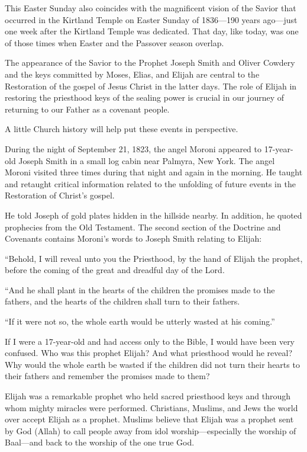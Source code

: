 \documentclass[letterpaper, 11pt]{report}
\begin{document}
This Easter Sunday also coincides with the magnificent vision of the Savior that occurred in the Kirtland Temple on Easter Sunday of 1836—190 years ago—just one week after the Kirtland Temple was dedicated. That day, like today, was one of those times when Easter and the Passover season overlap.

The appearance of the Savior to the Prophet Joseph Smith and Oliver Cowdery and the keys committed by Moses, Elias, and Elijah are central to the Restoration of the gospel of Jesus Christ in the latter days. The role of Elijah in restoring the priesthood keys of the sealing power is crucial in our journey of returning to our Father as a covenant people.

A little Church history will help put these events in perspective.

During the night of September 21, 1823, the angel Moroni appeared to 17-year-old Joseph Smith in a small log cabin near Palmyra, New York. The angel Moroni visited three times during that night and again in the morning. He taught and retaught critical information related to the unfolding of future events in the Restoration of Christ’s gospel.

He told Joseph of gold plates hidden in the hillside nearby. In addition, he quoted prophecies from the Old Testament. The second section of the Doctrine and Covenants contains Moroni’s words to Joseph Smith relating to Elijah:

“Behold, I will reveal unto you the Priesthood, by the hand of Elijah the prophet, before the coming of the great and dreadful day of the Lord.

“And he shall plant in the hearts of the children the promises made to the fathers, and the hearts of the children shall turn to their fathers.

“If it were not so, the whole earth would be utterly wasted at his coming.”

If I were a 17-year-old and had access only to the Bible, I would have been very confused. Who was this prophet Elijah? And what priesthood would he reveal? Why would the whole earth be wasted if the children did not turn their hearts to their fathers and remember the promises made to them?

Elijah was a remarkable prophet who held sacred priesthood keys and through whom mighty miracles were performed. Christians, Muslims, and Jews the world over accept Elijah as a prophet. Muslims believe that Elijah was a prophet sent by God (Allah) to call people away from idol worship—especially the worship of Baal—and back to the worship of the one true God.
\end{document}
